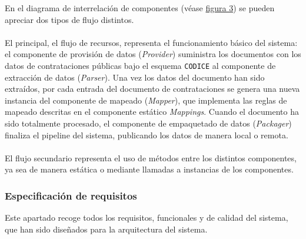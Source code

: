             En el diagrama de interrelación de componentes (véase \hyperref[fig:componentes]{figura 3}) se pueden apreciar dos tipos de flujo distintos.
            \\ \\
            El principal, el flujo de recursos, representa el funcionamiento básico del sistema: el componente de provisión de datos (\textit{Provider}) suministra los documentos con los datos de contrataciones públicas bajo el esquema \texttt{CODICE} al componente de extracción de datos (\textit{Parser}). Una vez los datos del documento han sido extraídos, por cada entrada del documento de contrataciones se genera una nueva instancia del componente de mapeado (\textit{Mapper}), que implementa las reglas de mapeado descritas en el componente estático \textit{Mappings}. Cuando el documento ha sido totalmente procesado, el componente de empaquetado de datos (\textit{Packager}) finaliza el pipeline del sistema, publicando los datos de manera local o remota.
            \\ \\
            El flujo secundario representa el uso de métodos entre los distintos componentes, ya sea de manera estática o mediante llamadas a instancias de los componentes.
            
        \subsubsection{Especificación de requisitos}
            Este apartado recoge todos los requisitos, funcionales y de calidad del sistema, que han sido diseñados para la arquitectura del sistema.

